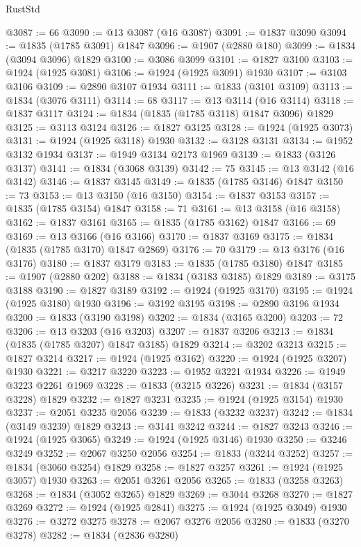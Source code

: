 \begin{lexlean}{RustStd}
\begin{coremodule}
@3087 := 66
@3090 := @13 @3087 (@16 @3087)
@3091 := @1837 @3090
@3094 := @1835 (@1785 @3091) @1847
@3096 := @1907 (@2880 @180)
@3099 := @1834 (@3094 @3096) @1829
@3100 := @3086 @3099
@3101 := @1827 @3100
@3103 := @1924 (@1925 @3081)
@3106 := @1924 (@1925 @3091) @1930
@3107 := @3103 @3106
@3109 := @2890 @3107 @1934
@3111 := @1833 (@3101 @3109)
@3113 := @1834 (@3076 @3111)
@3114 := 68
@3117 := @13 @3114 (@16 @3114)
@3118 := @1837 @3117
@3124 := @1834 (@1835 (@1785 @3118) @1847 @3096) @1829
@3125 := @3113 @3124
@3126 := @1827 @3125
@3128 := @1924 (@1925 @3073)
@3131 := @1924 (@1925 @3118) @1930
@3132 := @3128 @3131
@3134 := @1952 @3132 @1934
@3137 := @1949 @3134 @2173 @1969
@3139 := @1833 (@3126 @3137)
@3141 := @1834 (@3068 @3139)
@3142 := 75
@3145 := @13 @3142 (@16 @3142)
@3146 := @1837 @3145
@3149 := @1835 (@1785 @3146) @1847
@3150 := 73
@3153 := @13 @3150 (@16 @3150)
@3154 := @1837 @3153
@3157 := @1835 (@1785 @3154) @1847
@3158 := 71
@3161 := @13 @3158 (@16 @3158)
@3162 := @1837 @3161
@3165 := @1835 (@1785 @3162) @1847
@3166 := 69
@3169 := @13 @3166 (@16 @3166)
@3170 := @1837 @3169
@3175 := @1834 (@1835 (@1785 @3170) @1847 @2869)
@3176 := 70
@3179 := @13 @3176 (@16 @3176)
@3180 := @1837 @3179
@3183 := @1835 (@1785 @3180) @1847
@3185 := @1907 (@2880 @202)
@3188 := @1834 (@3183 @3185) @1829
@3189 := @3175 @3188
@3190 := @1827 @3189
@3192 := @1924 (@1925 @3170)
@3195 := @1924 (@1925 @3180) @1930
@3196 := @3192 @3195
@3198 := @2890 @3196 @1934
@3200 := @1833 (@3190 @3198)
@3202 := @1834 (@3165 @3200)
@3203 := 72
@3206 := @13 @3203 (@16 @3203)
@3207 := @1837 @3206
@3213 := @1834 (@1835 (@1785 @3207) @1847 @3185) @1829
@3214 := @3202 @3213
@3215 := @1827 @3214
@3217 := @1924 (@1925 @3162)
@3220 := @1924 (@1925 @3207) @1930
@3221 := @3217 @3220
@3223 := @1952 @3221 @1934
@3226 := @1949 @3223 @2261 @1969
@3228 := @1833 (@3215 @3226)
@3231 := @1834 (@3157 @3228) @1829
@3232 := @1827 @3231
@3235 := @1924 (@1925 @3154) @1930
@3237 := @2051 @3235 @2056
@3239 := @1833 (@3232 @3237)
@3242 := @1834 (@3149 @3239) @1829
@3243 := @3141 @3242
@3244 := @1827 @3243
@3246 := @1924 (@1925 @3065)
@3249 := @1924 (@1925 @3146) @1930
@3250 := @3246 @3249
@3252 := @2067 @3250 @2056
@3254 := @1833 (@3244 @3252)
@3257 := @1834 (@3060 @3254) @1829
@3258 := @1827 @3257
@3261 := @1924 (@1925 @3057) @1930
@3263 := @2051 @3261 @2056
@3265 := @1833 (@3258 @3263)
@3268 := @1834 (@3052 @3265) @1829
@3269 := @3044 @3268
@3270 := @1827 @3269
@3272 := @1924 (@1925 @2841)
@3275 := @1924 (@1925 @3049) @1930
@3276 := @3272 @3275
@3278 := @2067 @3276 @2056
@3280 := @1833 (@3270 @3278)
@3282 := @1834 (@2836 @3280)

\end{coremodule}
\end{lexlean}
